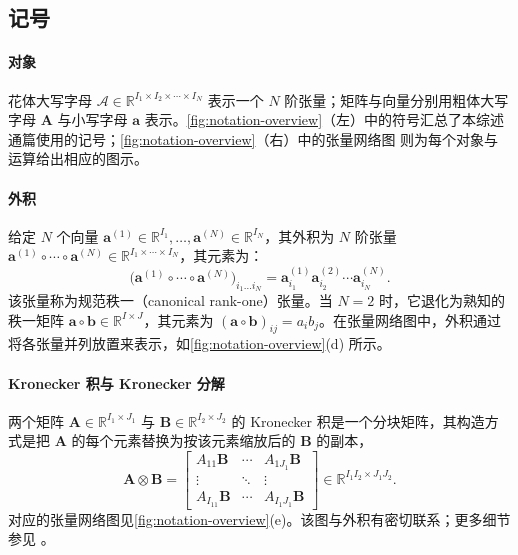 \documentclass[11pt]{article}
\newcommand{\R}{\mathbb{R}}
\newcommand{\ten}[1]{\mathcal{#1}}
\newcommand{\mat}[1]{\mathbf{#1}}
\newcommand{\vecb}[1]{\mathbf{#1}}
\begin{document}
\subsection{记号}

\paragraph{对象} 花体大写字母 $\ten{A}\in\R^{I_1\times I_2\times \cdots\times I_N}$ 表示一个 $N$ 阶张量；矩阵与向量分别用粗体大写字母 $\mat{A}$ 与小写字母 $\vecb{a}$ 表示。\cref{fig:notation-overview}（左）中的符号汇总了本综述通篇使用的记号；\cref{fig:notation-overview}（右）中的张量网络图 \cite{penrose1971tensordiagrams} 则为每个对象与运算给出相应的图示。


\paragraph{外积} 给定 $N$ 个向量 $\vecb{a}^{(1)}\in\R^{I_1},\ldots,\vecb{a}^{(N)}\in\R^{I_N}$，其外积为 $N$ 阶张量 $\vecb{a}^{(1)}\circ\cdots\circ\vecb{a}^{(N)}\in\R^{I_1\times\cdots\times I_N}$，其元素为：
\begin{equation}
\bigl(\vecb{a}^{(1)}\circ\cdots\circ\vecb{a}^{(N)}\bigr)_{i_1\ldots i_N}= \vecb{a}^{(1)}_{i_1}\vecb{a}^{(2)}_{i_2}\cdots \vecb{a}^{(N)}_{i_N}.
\end{equation}
该张量称为规范秩一（canonical rank-one）张量。当 $N=2$ 时，它退化为熟知的秩一矩阵 $\vecb{a}\circ\vecb{b}\in\R^{I\times J}$，其元素为 $(\vecb{a}\circ\vecb{b})_{ij}=a_ib_j$。在张量网络图中，外积通过将各张量并列放置来表示，如\cref{fig:notation-overview}(d) 所示。

\paragraph{Kronecker 积与 Kronecker 分解} 两个矩阵 $\mat{A}\in\R^{I_1\times J_1}$ 与 $\mat{B}\in\R^{I_2\times J_2}$ 的 Kronecker 积是一个分块矩阵，其构造方式是把 $\mat{A}$ 的每个元素替换为按该元素缩放后的 $\mat{B}$ 的副本，
\begin{equation}
  \mat{A}\otimes\mat{B}=
  \begin{bmatrix}
  A_{11}\mat{B} & \cdots & A_{1J_1}\mat{B} \\
  \vdots & \ddots & \vdots \\
  A_{I_11}\mat{B} & \cdots & A_{I_1J_1}\mat{B}
  \end{bmatrix}
  \in\R^{I_1I_2\times J_1J_2}.
\end{equation}
对应的张量网络图见\cref{fig:notation-overview}(e)。该图与外积有密切联系；更多细节参见 \cite{yokota2024tensorbasics}。
\end{document}
